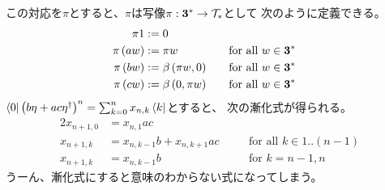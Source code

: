 {\begin{todo}[ここまで]
		この対応を$\pi$とすると、$\pi$は写像$\pi:{\mathbf{3}}^*\to{\ensuremath{{\mathcal{T}}}}_*$として
		次のように定義できる。
		\begin{alignat*}{2}
			\pi1 &:= 0 \\
			\pi\left({aw}\right) &:= \pi w &\quad& \text{for all } w\in{\ensuremath{\mathbf{3}}}^* \\
			\pi\left({bw}\right) &:= \beta\left({\pi w,0}\right) &\quad& \text{for all } w\in{\ensuremath{\mathbf{3}}}^* \\
			\pi\left({cw}\right) &:= \beta\left({0, \pi w}\right) &\quad& \text{for all } w\in{\ensuremath{\mathbf{3}}}^* \\
		\end{alignat*}
		$\mathinner{\langle{0}|}\left({b\eta+ac\eta^\dag}\right)^n=\sum_{k=0}^nx_{n,k}\mathinner{\langle{k}|}$とすると、
		次の漸化式が得られる。
		\begin{alignat*}{2}
			x_{n+1,0} &=  x_{n,1}ac \\
			x_{n+1,k} &=  x_{n,k-1}b + x_{n,k+1}ac 
				&\quad& \text{for all } k\in1..(n-1) \\
			x_{n+1,k} &=  x_{n,k-1}b
				&\quad& \text{for } k=n-1,n
		\end{alignat*}
		うーん、漸化式にすると意味のわからない式になってしまう。


\end{todo}}

